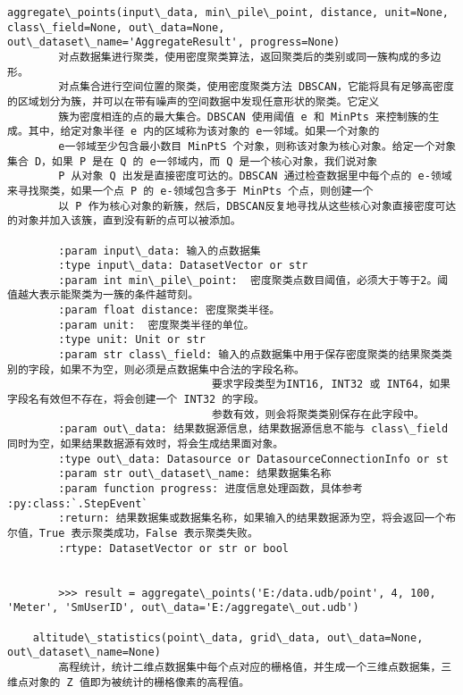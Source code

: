 \documentclass[11pt]{article}
\begin{document}
\begin{Verbatim}[commandchars=\\\{\}]
    aggregate\_points(input\_data, min\_pile\_point, distance, unit=None, class\_field=None, out\_data=None, out\_dataset\_name='AggregateResult', progress=None)
        对点数据集进行聚类，使用密度聚类算法，返回聚类后的类别或同一簇构成的多边形。
        对点集合进行空间位置的聚类，使用密度聚类方法 DBSCAN，它能将具有足够高密度的区域划分为簇，并可以在带有噪声的空间数据中发现任意形状的聚类。它定义
        簇为密度相连的点的最大集合。DBSCAN 使用阈值 e 和 MinPts 来控制簇的生成。其中，给定对象半径 e 内的区域称为该对象的 e一邻域。如果一个对象的
        e一邻域至少包含最小数目 MinPtS 个对象，则称该对象为核心对象。给定一个对象集合 D，如果 P 是在 Q 的 e一邻域内，而 Q 是一个核心对象，我们说对象
        P 从对象 Q 出发是直接密度可达的。DBSCAN 通过检查数据里中每个点的 e-领域来寻找聚类，如果一个点 P 的 e-领域包含多于 MinPts 个点，则创建一个
        以 P 作为核心对象的新簇，然后，DBSCAN反复地寻找从这些核心对象直接密度可达的对象并加入该簇，直到没有新的点可以被添加。
        
        :param input\_data: 输入的点数据集
        :type input\_data: DatasetVector or str
        :param int min\_pile\_point:  密度聚类点数目阈值，必须大于等于2。阈值越大表示能聚类为一簇的条件越苛刻。
        :param float distance: 密度聚类半径。
        :param unit:  密度聚类半径的单位。
        :type unit: Unit or str
        :param str class\_field: 输入的点数据集中用于保存密度聚类的结果聚类类别的字段，如果不为空，则必须是点数据集中合法的字段名称。
                                要求字段类型为INT16, INT32 或 INT64，如果字段名有效但不存在，将会创建一个 INT32 的字段。
                                参数有效，则会将聚类类别保存在此字段中。
        :param out\_data: 结果数据源信息，结果数据源信息不能与 class\_field同时为空，如果结果数据源有效时，将会生成结果面对象。
        :type out\_data: Datasource or DatasourceConnectionInfo or st
        :param str out\_dataset\_name: 结果数据集名称
        :param function progress: 进度信息处理函数，具体参考 :py:class:`.StepEvent`
        :return: 结果数据集或数据集名称，如果输入的结果数据源为空，将会返回一个布尔值，True 表示聚类成功，False 表示聚类失败。
        :rtype: DatasetVector or str or bool
        
        
        >>> result = aggregate\_points('E:/data.udb/point', 4, 100, 'Meter', 'SmUserID', out\_data='E:/aggregate\_out.udb')
    
    altitude\_statistics(point\_data, grid\_data, out\_data=None, out\_dataset\_name=None)
        高程统计，统计二维点数据集中每个点对应的栅格值，并生成一个三维点数据集，三维点对象的 Z 值即为被统计的栅格像素的高程值。
        

\end{Verbatim}
\end{document}
